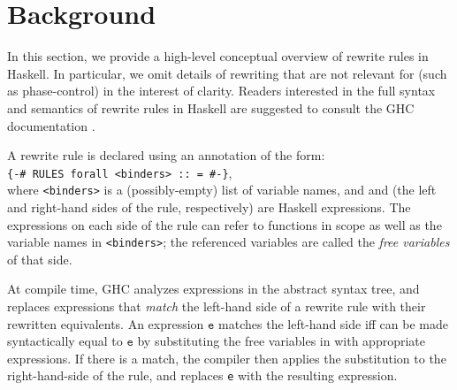 \section{Background}
\label{sec:background}

In this section, we provide a high-level conceptual overview of rewrite rules in
Haskell. In particular, we omit details of rewriting that are not relevant for
\Rulecheck (such as phase-control) in the interest of clarity. Readers
interested in the full syntax and semantics of rewrite rules in Haskell are
suggested to consult the GHC documentation \cite{userguide}.

A rewrite rule is declared using an annotation of the form:\\ \texttt{\{-\# RULES forall <binders>
:: \rlhs = \rrhs \#-\}},\\ where \texttt{<binders>} is a (possibly-empty) list
of variable names, and \rlhs and \rrhs (the left and
right-hand sides of the rule, respectively) are Haskell expressions. The
expressions on each side of the rule can refer to functions in scope as well as
the variable names in \texttt{<binders>}; the referenced variables are called
the \textit{free variables} of that side.

At compile time, GHC analyzes expressions in the abstract syntax tree, and
replaces expressions that \textit{match} the left-hand side of a rewrite rule
with their rewritten equivalents. An expression $\texttt{e}$ matches the
left-hand side \rlhs iff \rlhs can be made syntactically equal to $\texttt{e}$
by substituting the free variables in \rlhs with appropriate expressions. If
there is a match, the compiler then applies the substitution to the
right-hand-side of the rule, and replaces \texttt{e} with the resulting
expression.

